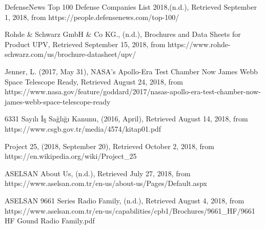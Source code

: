 \begingroup
\renewcommand{\section}[2]{}%
\begin{thebibliography}{}

	
 DefenseNews Top 100 Defense Companies List 2018,(n.d.), 
Retrieved September 1, 2018, from https://people.defensenews.com/top-100/
	



 Rohde \& Schwarz GmbH \& Co KG., (n.d.), Brochures and Data Sheets for Product UPV, Retrieved September 15, 2018, from https://www.rohde-schwarz.com/us/brochure-datasheet/upv/

 Jenner, L. (2017, May 31), NASA's Apollo-Era Test Chamber Now James Webb Space Telescope Ready, 
Retrieved August 24, 2018, from https://www.nasa.gov/feature/goddard/2017/nasas-apollo-era-test-chamber-now-james-webb-space-telescope-ready

 6331 Sayılı İş Sağlığı Kanunu, (2016, April),
Retrieved August 14, 2018, from https://www.csgb.gov.tr/media/4574/kitap01.pdf

 Project 25, (2018, September 20),
Retrieved October 2, 2018, from https://en.wikipedia.org/wiki/Project\_25

 ASELSAN About Us, (n.d.),
Retrieved July 27, 2018, from https://www.aselsan.com.tr/en-us/about-us/Pages/Default.aspx

 ASELSAN 9661 Series Radio Family, (n.d.), 
Retrieved August 4, 2018, from https://www.aselsan.com.tr/en-us/capabilities/cpb1/Brochures/9661\_HF/9661 HF Gound Radio Family.pdf


\end{thebibliography}
